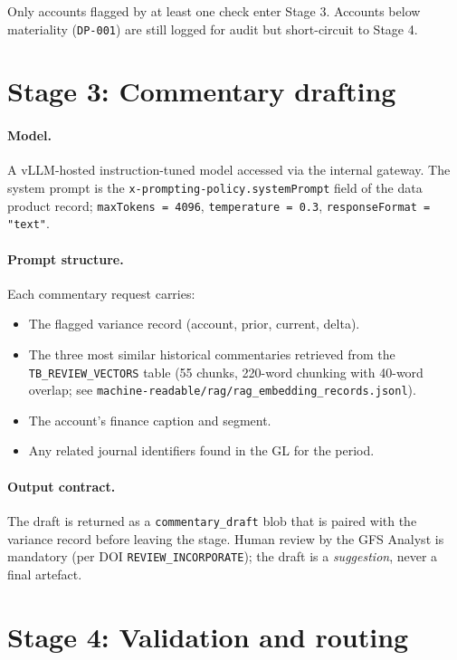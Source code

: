 Only accounts flagged by at least one check enter Stage 3. Accounts
below materiality (\texttt{DP-001}) are still logged for audit but
short-circuit to Stage 4.

\section{Stage 3: Commentary drafting}

\paragraph{Model.} A vLLM-hosted instruction-tuned model accessed
via the internal gateway. The system prompt is the
\texttt{x-prompting-policy.systemPrompt} field of the data product
record; \texttt{maxTokens = 4096}, \texttt{temperature = 0.3},
\texttt{responseFormat = "text"}.

\paragraph{Prompt structure.} Each commentary request carries:
\begin{itemize}
  \item The flagged variance record (account, prior, current, delta).
  \item The three most similar historical commentaries retrieved from
        the \texttt{TB\_REVIEW\_VECTORS} table (55 chunks, 220-word
        chunking with 40-word overlap; see
        \corpus\texttt{machine-readable/rag/rag\_embedding\_records.jsonl}).
  \item The account's finance caption and segment.
  \item Any related journal identifiers found in the GL for the period.
\end{itemize}

\paragraph{Output contract.} The draft is returned as a
\texttt{commentary\_draft} blob that is paired with the variance
record before leaving the stage. Human review by the GFS Analyst is
mandatory (per DOI \texttt{REVIEW\_INCORPORATE}); the draft is a
\emph{suggestion}, never a final artefact.

\section{Stage 4: Validation and routing}

